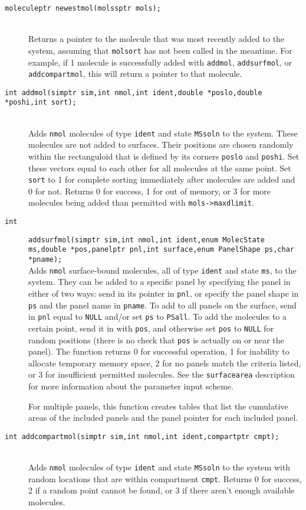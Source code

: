 \documentclass {scrbook}
\newcommand {\ttt} {\texttt}
\begin{document}
\begin{description}
\item[\ttt{moleculeptr newestmol(molssptr mols);}]
\hfill \\
Returns a pointer to the molecule that was most recently added to the system, assuming that \ttt{molsort} has not been called in the meantime. For example, if 1 molecule is successfully added with \ttt{addmol}, \ttt{addsurfmol}, or \ttt{addcompartmol}, this will return a pointer to that molecule.

\item[\ttt{int addmol(simptr sim,int nmol,int ident,double *poslo,double *poshi,int sort);}]
\hfill \\
Adds \ttt{nmol} molecules of type \ttt{ident} and state \ttt{MSsoln} to the system. These molecules are not added to surfaces. Their positions are chosen randomly within the rectanguloid that is defined by its corners \ttt{poslo} and \ttt{poshi}. Set these vectors equal to each other for all molecules at the same point. Set \ttt{sort} to 1 for complete sorting immediately after molecules are added and 0 for not. Returns 0 for success, 1 for out of memory, or 3 for more molecules being added than permitted with \ttt{mols->maxdlimit}.

\item[\ttt{int}]
\ttt{addsurfmol(simptr sim,int nmol,int ident,enum MolecState ms,double *pos,panelptr pnl,int surface,enum PanelShape ps,char *pname);} \\
Adds \ttt{nmol} surface-bound molecules, all of type \ttt{ident} and state \ttt{ms}, to the system. They can be added to a specific panel by specifying the panel in either of two ways: send in its pointer in \ttt{pnl}, or specify the panel shape in \ttt{ps} and the panel name in \ttt{pname}. To add to all panels on the surface, send in \ttt{pnl} equal to \ttt{NULL} and/or set \ttt{ps} to \ttt{PSall}. To add the molecules to a certain point, send it in with \ttt{pos}, and otherwise set \ttt{pos} to \ttt{NULL} for random positions (there is no check that \ttt{pos} is actually on or near the panel). The function returns 0 for successful operation, 1 for inability to allocate temporary memory space, 2 for no panels match the criteria listed, or 3 for insufficient permitted molecules. See the \ttt{surfacearea} description for more information about the parameter input scheme.

For multiple panels, this function creates tables that list the cumulative areas of the included panels and the panel pointer for each included panel.

\item[\ttt{int addcompartmol(simptr sim,int nmol,int ident,compartptr cmpt);}]
\hfill \\
Adds \ttt{nmol} molecules of type \ttt{ident} and state \ttt{MSsoln} to the system with random locations that are within compartment \ttt{cmpt}. Returns 0 for success, 2 if a random point cannot be found, or 3 if there aren't enough available molecules.


\end{description}
\end{document}
